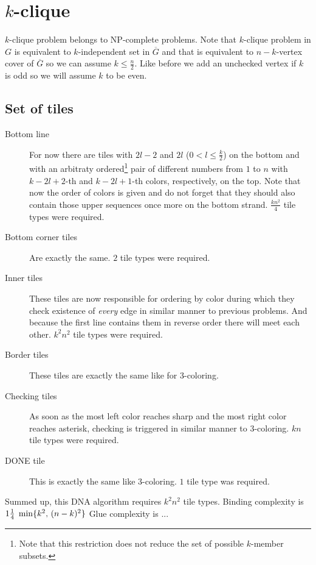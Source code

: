 \section{$k$-clique}

$k$-clique problem belongs to NP-complete problems. Note that $k$-clique problem in $G$ is equivalent to $k$-independent set in $\overline{G}$ and that is equivalent to $n-k$-vertex cover of $\overline{G}$ so we can assume $k \leq \frac{n}{2}$. Like before we add an unchecked vertex if $k$ is odd so we will assume $k$ to be even. %

\subsection*{Set of tiles}

\begin{description}
	\item[Bottom line] For now there are tiles with $2l-2$ and $2l$ ($0 < l \leq \frac{k}{2}$) on the bottom and with an arbitraty ordered\footnote{Note that this restriction does not reduce the set of possible $k$-member subsets.} pair of different numbers from $1$ to $n$ with $k-2l+2$-th and $k-2l+1$-th colors, respectively, on the top. Note that now the order of colors is given and do not forget that they should also contain those upper sequences once more on the bottom strand. $\frac{kn^2}{4}$ tile types were required. %
	\item[Bottom corner tiles] Are exactly the same. $2$ tile types were required.
	\item[Inner tiles] These tiles are now responsible for ordering by color during which they check existence of {\em every} edge in similar manner to previous problems. And because the first line contains them in reverse order there will meet each other. $k^2 n^2$ tile types were required. %
	\item[Border tiles] These tiles are exactly the same like for 3-coloring.
	\item[Checking tiles] As soon as the most left color reaches sharp and the most right color reaches asterisk, checking is triggered in similar manner to 3-coloring. $kn$ tile types were required.
	\item[DONE tile] This is exactly the same like 3-coloring. $1$ tile type was required.
\end{description}
Summed up, this DNA algorithm requires $k^2 n^2$ tile types. Binding complexity is $1\nicefrac{1}{4}\;\min\{k^2,\,(n-k)^2\}$ Glue complexity is ... %

